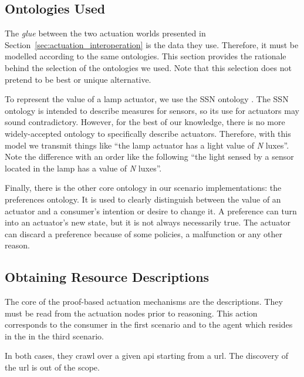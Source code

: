 \subsection{Ontologies Used}

The \emph{glue} between the two actuation worlds presented in Section~\ref{sec:actuation_interoperation} is the data they use. %
Therefore, it must be modelled according to the same ontologies.
This section provides the rationale behind the selection of the ontologies we used.
Note that this selection does not pretend to be best or unique alternative.

To represent the value of a lamp actuator, we use the SSN ontology .
The SSN ontology is intended to describe measures for sensors, so its use for actuators may sound contradictory.
However, for the best of our knowledge, there is no more widely-accepted ontology to specifically describe actuators.
Therefore, with this model we transmit things like ``the lamp actuator has a light value of \emph{N} luxes''.
Note the difference with an order like the following ``the light sensed by a sensor located in the lamp has a value of \emph{N} luxes''.


Finally, there is the other core ontology in our scenario implementations: the preferences ontology.
It is used to clearly distinguish between the value of an actuator and a consumer's intention or desire to change it.
A preference can turn into an actuator's new state, but it is not always necessarily true.
The actuator can discard a preference because of some policies, a malfunction or any other reason.



\subsection{Obtaining Resource Descriptions}

The core of the proof-based actuation mechanisms are the descriptions.
They must be read from the actuation nodes prior to reasoning. %
This action corresponds to the consumer in the first scenario and to the agent which resides in the \Space{} in the third scenario.

In both cases, they crawl over a given \ac{api} starting from a \ac{url}.
The discovery of the \ac{url} is out of the scope.


